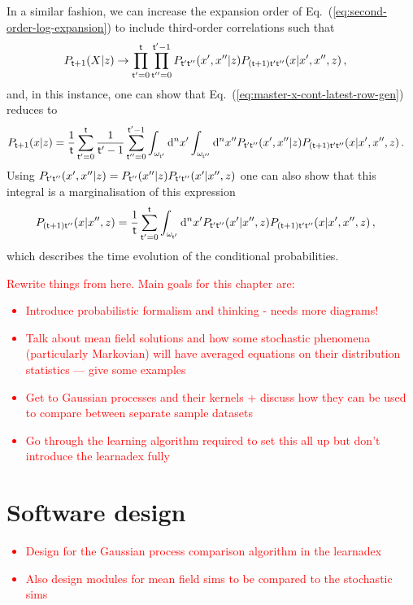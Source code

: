 In a similar fashion, we can increase the expansion order of Eq.~(\ref{eq:second-order-log-expansion}) to include third-order correlations such that 
\begin{align}
P_{{\sf t}+1}(X\vert z) &\rightarrow \prod_{{\sf t}'=0}^{{\sf t}}\prod_{{\sf t}''=0}^{{\sf t}'-1} P_{{\sf t}'{\sf t}''}(x',x''\vert z)P_{({\sf t}+1){\sf t}'{\sf t}''}(x\vert x',x'',z) \,,
\end{align}
and, in this instance, one can show that Eq.~(\ref{eq:master-x-cont-latest-row-gen}) reduces to
\begin{align}
P_{{\sf t}+1}(x\vert z) &= \frac{1}{{\sf t}}\sum_{{\sf t}'=0}^{{\sf t}}\frac{1}{{\sf t}'-1}\sum_{{\sf t}''=0}^{{\sf t}'-1}\int_{\omega_{{\sf t}'}}{\rm d}^nx'\int_{\omega_{{\sf t}''}}{\rm d}^nx'' P_{{\sf t}'{\sf t}''}(x',x''\vert z)P_{({\sf t}+1){\sf t}'{\sf t}''}(x\vert x',x'',z) \label{eq:third-order-correl} \,.
\end{align}
Using $P_{{\sf t}'{\sf t}''}(x',x''\vert z) = P_{{\sf t}''}(x''\vert z) P_{{\sf t}'{\sf t}''}(x'\vert x'', z)$ one can also show that this integral is a marginalisation of this expression
\begin{align}
P_{({\sf t}+1){\sf t}''}(x\vert x'', z) &= \frac{1}{{\sf t}}\sum_{{\sf t}'=0}^{{\sf t}}\int_{\omega_{{\sf t}'}}{\rm d}^nx'P_{{\sf t}'{\sf t}''}(x'\vert x'',z)P_{({\sf t}+1){\sf t}'{\sf t}''}(x\vert x',x'',z) \,,
\end{align}
which describes the time evolution of the conditional probabilities.

\textcolor{red}{
Rewrite things from here. Main goals for this chapter are:
\begin{itemize}
\item{Introduce probabilistic formalism and thinking - needs more diagrams!}
\item{Talk about mean field solutions and how some stochastic phenomena (particularly Markovian) will have averaged equations on their distribution statistics --- give some examples}
\item{Get to Gaussian processes and their kernels + discuss how they can be used to compare between separate sample datasets}
\item{Go through the learning algorithm required to set this all up but don't introduce the learnadex fully}
\end{itemize}
}

\section{\sffamily Software design}

\textcolor{red}{
\begin{itemize}
\item{Design for the Gaussian process comparison algorithm in the learnadex}
\item{Also design modules for mean field sims to be compared to the stochastic sims}
\end{itemize}
}

    